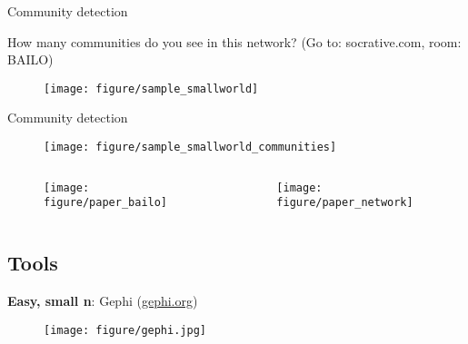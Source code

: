 \documentclass[serif, aspectratio=169]{beamer}
\begin{document}
\begin{frame}
{Community detection}

How many communities do you see in this network? (Go to: socrative.com, room: BAILO)

\begin{figure}
    \texttt{[image: figure/sample\_smallworld]}
\end{figure}

\end{frame}

\begin{frame}
{Community detection}

\begin{figure} \texttt{[image: figure/sample\_smallworld\_communities]}
\end{figure}

\end{frame}


\begin{frame}

\begin{columns}

\begin{column}{0.6\textwidth}
\begin{figure}
    \texttt{[image: figure/paper\_bailo]}
\end{figure}
\end{column}

\begin{column}{0.4\textwidth}
\begin{figure}
    \texttt{[image: figure/paper\_network]}
\end{figure}
\end{column}

\end{columns}

\end{frame}

\subsection{Tools}

\begin{frame}

\centering \textbf{Easy, small n}: Gephi (\url{gephi.org})

\begin{figure}
    \centering
    \texttt{[image: figure/gephi.jpg]}
\end{figure}

\end{frame}
\end{document}
